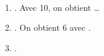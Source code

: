    \ \\ [-5mm]
   \begin{enumerate}
      \item {}. Avec 10, on obtient {} \dots
      \item {}. On obtient 6 avec {}.
      \item {}.
   \end{enumerate}
